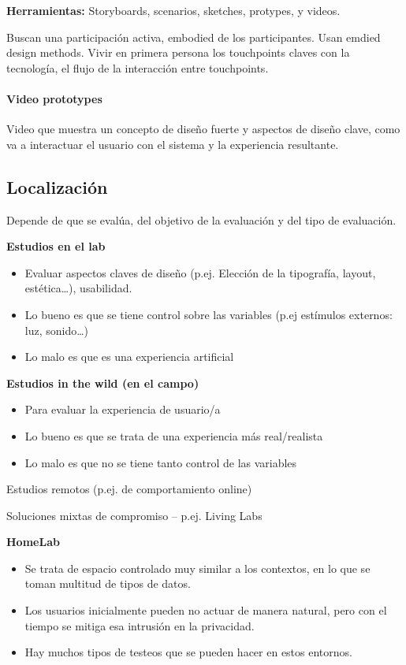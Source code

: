 \documentclass[12pt]{report} %
\begin{document}
\textbf{Herramientas:} Storyboards, scenarios, sketches, protypes, y videos.

Buscan una participación activa, embodied de los participantes. Usan emdied design methods. Vivir en primera persona los touchpoints claves con la tecnología, el flujo de la interacción entre touchpoints.

\paragraph{Video prototypes}
Video que muestra un concepto de diseño fuerte y aspectos de diseño clave, como va a interactuar el usuario con el sistema y la experiencia resultante.

\subsection{Localización}
Depende de que se evalúa, del objetivo de la evaluación y del tipo de evaluación.

\textbf{Estudios en el lab}
\begin{itemize}
  \item Evaluar aspectos claves de diseño (p.ej. Elección de la tipografía, layout, estética…),
  usabilidad.
  \item Lo bueno es que se tiene control sobre las variables (p.ej estímulos externos: luz, sonido…)
  \item Lo malo es que es una experiencia artificial
\end{itemize}

\textbf{Estudios in the wild (en el campo)}
\begin{itemize}
  \item Para evaluar la experiencia de usuario/a
  \item Lo bueno es que se trata de una experiencia más real/realista
  \item Lo malo es que no se tiene tanto control de las variables
\end{itemize}

Estudios remotos (p.ej. de comportamiento online)

Soluciones mixtas de compromiso – p.ej. Living Labs

\textbf{HomeLab}
\begin{itemize}
  \item Se trata de espacio controlado muy similar a los contextos, en lo que se toman multitud de tipos de datos.
  \item Los usuarios inicialmente pueden no actuar de manera natural, pero con el tiempo se mitiga esa intrusión en la privacidad.
  \item Hay muchos tipos de testeos que se pueden hacer en estos entornos.
\end{itemize}
\end{document}
